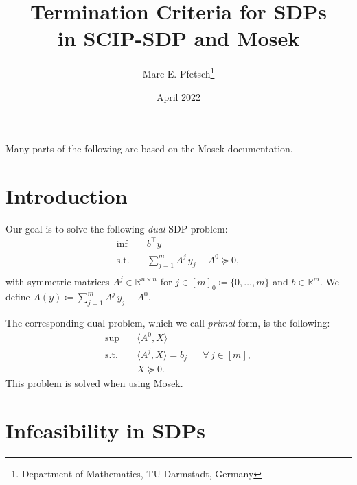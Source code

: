 \documentclass[10pt, a4paper]{article}
\title{Termination Criteria for SDPs\\ in SCIP-SDP and Mosek}
\author{Marc E. Pfetsch\thanks{Department of Mathematics, TU Darmstadt, Germany}}
\date{April 2022}
\newcommand{\define}{\coloneqq}
\newcommand{\skal}[2]{\langle{#1},{#2}\rangle}
\newcommand{\T}{^{\top}}
\newcommand{\R}{\mathds{R}}
\newtheorem{lemma}[theorem]{Lemma}
\begin{document}
\maketitle

\noindent
Many parts of the following are based on the Mosek documentation.

\section{Introduction}

Our goal is to solve the following \emph{dual} SDP problem:
\begin{equation}\label{SDP-D}
  \begin{aligned}
    \inf \quad & b\T y \\
    \text{s.t.} \quad & \sum_{j=1}^m A^j\, y_j - A^0 \succeq 0, \\
  \end{aligned}
\end{equation}
with symmetric matrices $A^j \in \R^{n \times n}$ for
$j \in [m]_0 \define \{0, \dots, m\}$ and $b \in \R^m$.  We define
$A(y) \define \sum_{j=1}^m A^j\, y_j - A^0$.

The corresponding dual problem, which we call \emph{primal} form, is the
following:
\begin{equation}\label{SDP-P}
  \begin{aligned}
     \sup \quad & \skal{A^0}{X} \\
     \mbox{s.t.} \quad & \skal{A^j}{X} = b_j && \forall \, j \in [m],\\
     & X \succeq 0.
  \end{aligned}
\end{equation}
This problem is solved when using Mosek.

\section{Infeasibility in SDPs}

%
%
\end{document}

